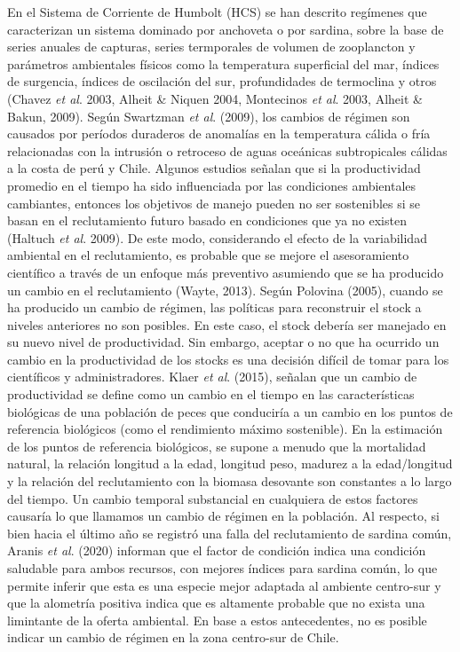 \documentclass[
  spanish,
]{article}
\begin{document}
En el Sistema de Corriente de Humbolt (HCS) se han descrito regímenes
que caracterizan un sistema dominado por anchoveta o por sardina, sobre
la base de series anuales de capturas, series termporales de volumen de
zooplancton y parámetros ambientales físicos como la temperatura
superficial del mar, índices de surgencia, índices de oscilación del
sur, profundidades de termoclina y otros (Chavez \emph{et al}. 2003,
Alheit \& Niquen 2004, Montecinos \emph{et al}. 2003, Alheit \& Bakun,
2009). Según Swartzman \emph{et al}. (2009), los cambios de régimen son
causados por períodos duraderos de anomalías en la temperatura cálida o
fría relacionadas con la intrusión o retroceso de aguas oceánicas
subtropicales cálidas a la costa de perú y Chile. Algunos estudios
señalan que si la productividad promedio en el tiempo ha sido
influenciada por las condiciones ambientales cambiantes, entonces los
objetivos de manejo pueden no ser sostenibles si se basan en el
reclutamiento futuro basado en condiciones que ya no existen (Haltuch
\emph{et al}. 2009). De este modo, considerando el efecto de la
variabilidad ambiental en el reclutamiento, es probable que se mejore el
asesoramiento científico a través de un enfoque más preventivo asumiendo
que se ha producido un cambio en el reclutamiento (Wayte, 2013). Según
Polovina (2005), cuando se ha producido un cambio de régimen, las
políticas para reconstruir el stock a niveles anteriores no son
posibles. En este caso, el stock debería ser manejado en su nuevo nivel
de productividad. Sin embargo, aceptar o no que ha ocurrido un cambio en
la productividad de los stocks es una decisión difícil de tomar para los
científicos y administradores. Klaer \emph{et al}. (2015), señalan que
un cambio de productividad se define como un cambio en el tiempo en las
características biológicas de una población de peces que conduciría a un
cambio en los puntos de referencia biológicos (como el rendimiento
máximo sostenible). En la estimación de los puntos de referencia
biológicos, se supone a menudo que la mortalidad natural, la relación
longitud a la edad, longitud peso, madurez a la edad/longitud y la
relación del reclutamiento con la biomasa desovante son constantes a lo
largo del tiempo. Un cambio temporal substancial en cualquiera de estos
factores causaría lo que llamamos un cambio de régimen en la población.
Al respecto, si bien hacia el último año se registró una falla del
reclutamiento de sardina común, Aranis \emph{et al}. (2020) informan que
el factor de condición indica una condición saludable para ambos
recursos, con mejores índices para sardina común, lo que permite inferir
que esta es una especie mejor adaptada al ambiente centro-sur y que la
alometría positiva indica que es altamente probable que no exista una
limintante de la oferta ambiental. En base a estos antecedentes, no es
posible indicar un cambio de régimen en la zona centro-sur de Chile.
\end{document}
